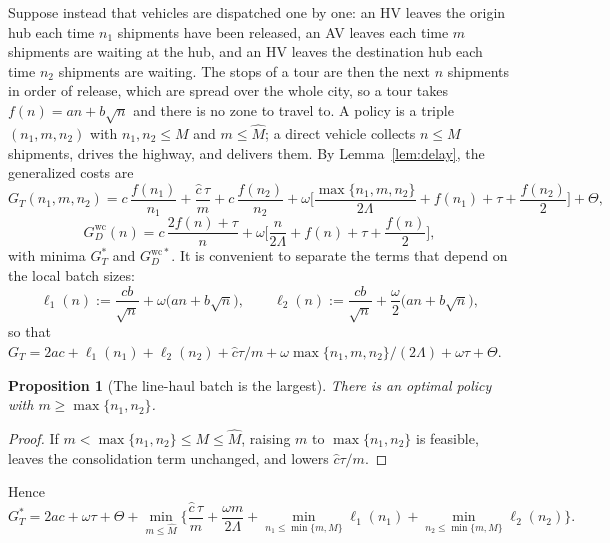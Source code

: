 \documentclass[10pt, reqno]{amsart}
\newtheorem{proposition}{Proposition}
\theoremstyle{definition}
\begin{document}
Suppose instead that vehicles are dispatched one by one: an HV leaves the origin hub each time $n_1$ shipments have been released, an AV leaves each time $m$ shipments are waiting at the hub, and an HV leaves the destination hub each time $n_2$ shipments are waiting. The stops of a tour are then the next $n$ shipments in order of release, which are spread over the whole city, so a tour takes $f(n)=an+b\sqrt n$ and there is no zone to travel to. A policy is a triple $(n_1,m,n_2)$ with $n_1,n_2\le M$ and $m\le\hat M$; a direct vehicle collects $n\le M$ shipments, drives the highway, and delivers them. By Lemma~\ref{lem:delay}, the generalized costs are
\begin{equation}\label{eq:GT}
G_T(n_1,m,n_2)=c\,\frac{f(n_1)}{n_1}+\frac{\hat c\,\tau}{m}+c\,\frac{f(n_2)}{n_2}
+\omega\Big[\frac{\max\{n_1,m,n_2\}}{2\Lambda}+f(n_1)+\tau+\frac{f(n_2)}{2}\Big]+\Theta ,
\end{equation}
\begin{equation}\label{eq:GD}
G_D^{\mathrm{wc}}(n)=c\,\frac{2f(n)+\tau}{n}+\omega\Big[\frac{n}{2\Lambda}+f(n)+\tau+\frac{f(n)}{2}\Big],
\end{equation}
with minima $G_T^*$ and $G_D^{\mathrm{wc}*}$. It is convenient to separate the terms that depend on the local batch sizes:
\begin{equation}\label{eq:ell}
\ell_1(n):=\frac{cb}{\sqrt n}+\omega\big(an+b\sqrt n\big),\qquad
\ell_2(n):=\frac{cb}{\sqrt n}+\frac{\omega}{2}\big(an+b\sqrt n\big),
\end{equation}
so that $G_T=2ac+\ell_1(n_1)+\ell_2(n_2)+\hat c\tau/m+\omega\max\{n_1,m,n_2\}/(2\Lambda)+\omega\tau+\Theta$.

\begin{proposition}[The line-haul batch is the largest]\label{prop:structure}
There is an optimal policy with $m\ge\max\{n_1,n_2\}$.
\end{proposition}

\begin{proof}
If $m<\max\{n_1,n_2\}\le M\le\hat M$, raising $m$ to $\max\{n_1,n_2\}$ is feasible, leaves the consolidation term unchanged, and lowers $\hat c\tau/m$.
\end{proof}

Hence
\begin{equation}\label{eq:reduced}
G_T^*=2ac+\omega\tau+\Theta+\min_{m\le\hat M}\Big\{\frac{\hat c\,\tau}{m}+\frac{\omega m}{2\Lambda}+\min_{n_1\le\min\{m,M\}}\ell_1(n_1)+\min_{n_2\le\min\{m,M\}}\ell_2(n_2)\Big\}.
\end{equation}
\end{document}
